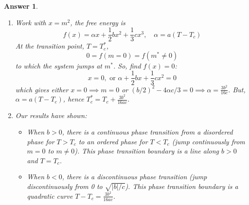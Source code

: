 \documentclass[a4paper]{article}
\newtheorem{ans}{Answer}[section]
\theoremstyle{new}
\begin{document}
\begin{ans}
\begin{enumerate}[label=(\alph*)]
\begin{center}
\end{center}
\item Work with $x=m^2$, the free energy is
$$f(x)=\alpha x+\frac{1}{2}bx^2+\frac{1}{3}cx^3,\quad\alpha=a(T-T_c)$$
At the transition point, $T=T_c^*$, 
$$0=f(m=0)=f(m^*\neq 0)$$
to which the system jumps at $m^*$. So, find $f(x)=0$:
$$x=0,\text{ or } \alpha+\frac{1}{2}bx+\frac{1}{3}cx^2=0$$
which gives either $x=0\implies m=0$ or $(b/2)^2-4\alpha c/3=0\implies \alpha=\frac{3b^2}{16c}$. But, $\alpha=a(T-T_c)$, hence $T_c^*=T_c+\frac{3b^2}{16ac}$.
\item Our results have shown:
\begin{itemize}
    \item When $b>0$, there is a continuous phase transition from a disordered phase for $T>T_c$ to an ordered phase for $T<T_c$ (jump continuously from $m=0$ to $m\neq 0$). This phase transition boundary is a line along $b>0$ and $T=T_c$.
    \item When $b<0$, there is a discontinuous phase transition (jump discontinuously from 0 to $\sqrt{|b|/c}$). This phase transition boundary is a quadratic curve $T-T_c=\frac{3b^2}{16ac}$.
\end{itemize}
\begin{center}
\end{center}
\end{enumerate}
\end{ans}
\newpage
\end{document}
